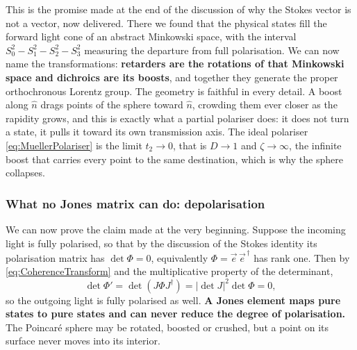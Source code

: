             This is the promise made at the end of the discussion of why the Stokes vector is not a vector, now delivered. There we found that the physical states fill the forward light cone of an abstract Minkowski space, with the interval $S_0^2-S_1^2-S_2^2-S_3^2$ measuring the departure from full polarisation. We can now name the transformations: \textbf{retarders are the rotations of that Minkowski space and dichroics are its boosts}, and together they generate the proper orthochronous Lorentz group. The geometry is faithful in every detail. A boost along $\hat n$ drags points of the sphere toward $\hat n$, crowding them ever closer as the rapidity grows, and this is exactly what a partial polariser does: it does not turn a state, it pulls it toward its own transmission axis. The ideal polariser \ref{eq:MuellerPolariser} is the limit $t_2\to0$, that is $D\to1$ and $\zeta\to\infty$, the infinite boost that carries every point to the same destination, which is why the sphere collapses.

        \subsubsection{What no Jones matrix can do: depolarisation}

            We can now prove the claim made at the very beginning. Suppose the incoming light is fully polarised, so that by the discussion of the Stokes identity its polarisation matrix has $\det\Phi=0$, equivalently $\Phi=\vec{e}\,\vec{e}^{\,\dagger}$ has rank one. Then by \ref{eq:CoherenceTransform} and the multiplicative property of the determinant,
            \begin{equation}\label{eq:DetTransform}
                \det\Phi' = \det\left(J\Phi J^{\dagger}\right) = \left|\det J\right|^2\det\Phi = 0 ,
            \end{equation}
            so the outgoing light is fully polarised as well. \textbf{A Jones element maps pure states to pure states and can never reduce the degree of polarisation.} The Poincaré sphere may be rotated, boosted or crushed, but a point on its surface never moves into its interior.

